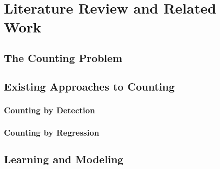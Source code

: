 \def\baselinestretch{1}

\chapter{Literature Review and Related Work}

\def\baselinestretch{1.66}




\smallskip

\goodbreak
\section{The Counting Problem}

\bigskip

\goodbreak

\section{Existing Approaches to Counting}
\subsection{Counting by Detection}
\subsection{Counting by Regression}


\bigskip

\goodbreak

\section{Learning and Modeling}


\bigskip


